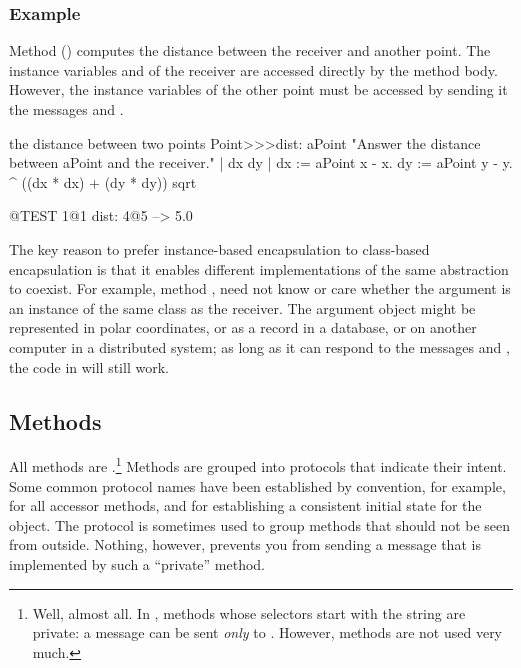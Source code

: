 \documentclass[a4paper,10pt,twoside]{book}
\begin{document}
\subsubsection{Example}
Method  () computes the distance between the receiver and another point. The instance variables  and  of the receiver are accessed directly by the method body.  However, the instance variables of the other point must be accessed by sending it the messages  and .

\begin{method}[dist:]{the distance between two points}
Point>>>dist: aPoint 
	"Answer the distance between aPoint and the receiver."  
	| dx dy |
	dx := aPoint x - x.
	dy :=  aPoint y - y.
	^ ((dx * dx) + (dy * dy)) sqrt
\end{method}

\begin{code}{@TEST}
1@1 dist: 4@5 --> 5.0
\end{code}

The key reason to prefer instance-based encapsulation to class-based encapsulation is that it enables different implementations of the same abstraction to coexist.
For example, method , need not know or care whether the argument  is an instance of the same class as the receiver.  The argument object might be represented in polar coordinates, or as a record in a database, or on another computer in a distributed system; as long as it can respond to the messages  and , the code in  will still work.

\subsection{Methods}

All methods are .\footnote{Well, almost all.  In \squeak, methods whose selectors start with the string  are private: a  message can be sent \emph{only} to \self.  However,  methods are not used very much.}
Methods are grouped into protocols that indicate their intent.
Some common protocol names have been established by convention, for example,  for all accessor methods, and  for establishing a consistent initial state for the object.
The protocol  is sometimes used to group methods that should not be seen from outside.
Nothing, however, prevents you from sending a message that is implemented by such a ``private'' method.
\end{document}
